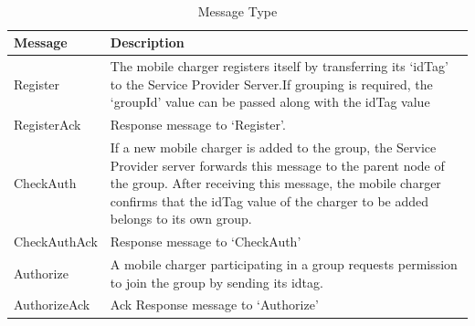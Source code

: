 \FloatBarrier
\begin{table}[h]
 \begin{center}
     \caption{ Message Type}
\paragraph{}

\begin{tabular}{ |p{3cm}|p{9cm}| }
\hline
\bf Message  & \bf Description  \\
\hline
Register & The mobile charger registers itself by             
transferring its ‘idTag’ to the Service
Provider Server.If grouping is
required, the ‘groupId’ value can be
passed along with the idTag value  \\
\hline
RegisterAck & Response message to ‘Register’.   \\
\hline
CheckAuth & If a new mobile charger is added to the
group, the Service Provider server
forwards this message to the parent
node of the group. After receiving this
message, the mobile charger confirms
that the idTag value of the charger to
be added belongs to its own group.  \\
\hline
CheckAuthAck & Response message to ‘CheckAuth’   \\
\hline
Authorize  &  A mobile charger participating in a
group requests permission to join the
group by sending its idtag. \\
\hline
AuthorizeAck & Ack Response message to ‘Authorize’  \\
\hline
     \end{tabular}
   \end{center}
  \end{table}
\FloatBarrier

\paragraph{}
\paragraph{}


